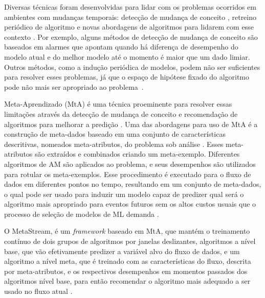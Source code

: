 Diversas técnicas foram desenvolvidas para lidar com os problemas ocorridos em ambientes com mudanças
temporais: detecção de mudança de conceito
\cite{klinkenberg2000detecting,zenisek2019machine}, retreino periódico de algoritmo
\cite{bifet2007learning,anderson2019recurring,ramanath2020lambda} e novas abordagens de algoritmos para lidarem com esse contexto \cite{zang2014comparative,manapragada2018extremely,cano2020kappa}. Por exemplo, alguns
métodos de detecção de mudança de conceito \cite{gama2010knowledge} são
baseados em alarmes que apontam quando há diferença de desempenho do modelo
atual e do melhor modelo até o momento é maior que um dado limiar. Outros métodos,
como a indução periódica de modelos, podem não ser suficientes para resolver
esses problemas, já que o espaço de hipótese fixado do algoritmo pode não mais
ser apropriado ao problema~\cite{rossi2014metastream}.

Meta-Aprendizado (MtA) é uma técnica proeminente para resolver essas limitações
através da detecção de mudança de conceito e recomendação de algoritmos para
melhorar a predição \cite{Anderson2019,VanRijn2016,Zarmehri2015}. Uma das abordagens para uso de MtA é a construção de meta-dados \cite{Vanschoren2018,khan2020literature} baseado em uma
conjunto de características descritivas, nomeados meta-atributos, do problema
sob análise \cite{Rivolli2018,lorena2019complex}. Esses meta-atributos são extraídos e combinados
criando um meta-exemplo. Diferentes algoritmos de AM são aplicados ao problema,
e seus desempenhos são utilizados para rotular os meta-exemplos. Esse
procedimento é executado para o fluxo de dados em diferentes pontos no tempo,
resultando em um conjunto de meta-dados, o qual pode ser usado para induzir um
modelo capaz de predizer qual será o algoritmo mais apropriado para eventos
futuros sem os altos custos usuais que o processo de seleção de modelos de ML
demanda \cite{Munoz2018}.

O MetaStream, é um \textit{framework} baseado em MtA, que mantém o treinamento contínuo de dois grupos de algoritmos por janelas deslizantes, algoritmos a nível base, que vão efetivamente predizer a variável alvo do fluxo de dados, e um algoritmo a nível meta, que é treinado com as características do fluxo, descrita por meta-atributos, e os respectivos desempenhos em momentos passados dos algoritmos nível base, para então recomendar o algoritmo mais adequado a ser usado no fluxo atual \cite{rossi2012, rossi2014metastream}.

